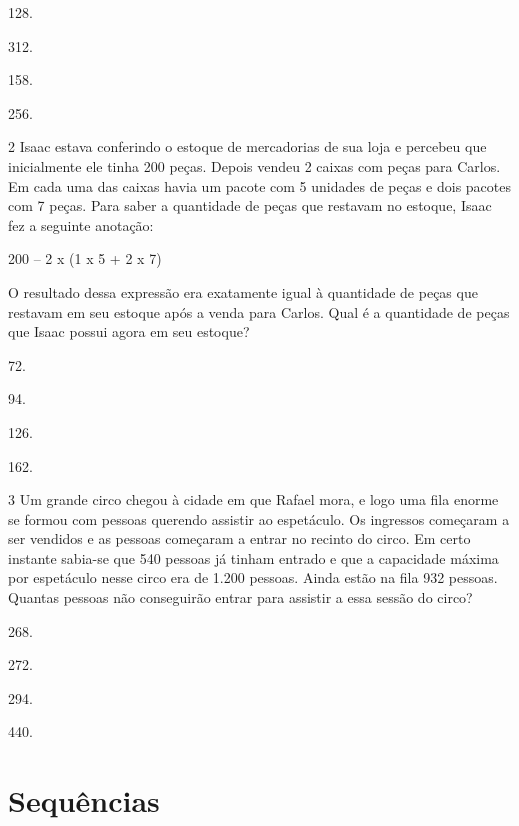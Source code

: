 \begin{mdframed}[linewidth=2pt,linecolor=salmao,roundcorner=2pt]
\begin{escolha}
\item
  128.
\item
  312.
\item
  158.
\item
  256.
\end{escolha}

\num{2} Isaac estava conferindo o estoque de mercadorias de sua loja e percebeu
que inicialmente ele tinha 200 peças. Depois vendeu 2 caixas com peças
para Carlos. Em cada uma das caixas havia um pacote com 5 unidades de peças e dois
pacotes com 7 peças. Para saber a quantidade de peças que restavam no estoque, Isaac fez a
seguinte anotação:

\begin{mdframed}[linewidth=2pt,linecolor=azul!20,backgroundcolor=azul!20,roundcorner=2pt]
200 -- 2 x (1 x 5 + 2 x 7)
\end{mdframed}

O resultado dessa expressão era exatamente igual à quantidade de peças
que restavam em seu estoque após a venda para Carlos. Qual é a
quantidade de peças que Isaac possui agora em seu estoque?

\begin{escolha}
\item
  72.
\item
  94.
\item
  126.
\item
  162.
\end{escolha}


\num{3} Um grande circo chegou à cidade em que Rafael mora, e logo uma fila
enorme se formou com pessoas querendo assistir ao espetáculo. Os
ingressos começaram a ser vendidos e as pessoas começaram a entrar no
recinto do circo. Em certo instante sabia-se que 540 pessoas já tinham
entrado e que a capacidade máxima por espetáculo nesse circo era de 1.200 pessoas. Ainda estão na fila 932 pessoas. Quantas pessoas não
conseguirão entrar para assistir a essa sessão do circo?

\begin{escolha}
\item
  268.
\item
  272.
\item
  294.
\item
  440.
\end{escolha}


\chapter{Sequências}


\end{mdframed}
